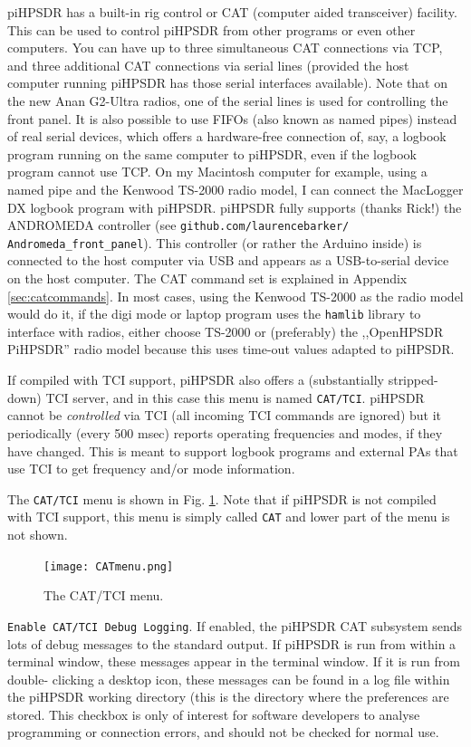 \documentclass[12pt]{book}
\def\rett#1{\texttt{\color{red}#1}}
\def\bltt#1{\texttt{\color{blue}#1}}
\def\pH{pi\-HPSDR\xspace}
\begin{document}
\pH has a built-in rig control or CAT (computer aided transceiver) facility. This can be used to control
\pH from other programs or even other computers. You can have up to three simultaneous CAT connections
via TCP, and three additional CAT connections via serial lines (provided the host computer running \pH
has those serial interfaces available). Note that on the new Anan G2-Ultra radios, one of the serial lines
is used for controlling the front panel.
It is also possible to use FIFOs (also known as named pipes) instead of real serial devices, which offers a
hardware-free connection
of, say, a logbook program running on the same computer to \pH, even if the logbook program cannot use
TCP. On my Macintosh computer for example, using a named pipe and the Kenwood TS-2000 radio model,
I can connect the MacLogger DX logbook program with \pH.
\pH fully supports (thanks Rick!) the ANDROMEDA controller (see \texttt{github.com/laurencebarker/
Andromeda\_front\_panel}).
This controller (or rather the Arduino inside) is connected to the host computer via USB and appears as a
USB-to-serial
device on the host computer. The CAT command set is explained in Appendix \ref{sec:catcommands}. In most
cases, using
the Kenwood TS-2000 as the radio model would do it, if the digi mode or laptop program uses the
\texttt{hamlib} library  to interface with
radios, either choose TS-2000 or (preferably) the ,,OpenHPSDR PiHPSDR'' radio model because this
uses time-out values adapted to \pH.

If compiled  with TCI  support, \pH also offers a (substantially  stripped-down) TCI server, and in this
case this menu is named \bltt{CAT/TCI}. \pH cannot
be \textit{controlled} via TCI (all incoming TCI commands are  ignored) but it periodically (every 500 msec)
reports operating frequencies  and modes, if they have changed. This is meant  to support  logbook programs
and external PAs that use TCI  to get frequency and/or mode information.

The \bltt{CAT/TCI} menu is shown in Fig. \ref{fig:CATmenu}. Note that if \pH  is  not compiled
with TCI support,  this menu is simply called  \bltt{CAT} and lower part  of the menu is not shown.

\begin{figure}[ht]
\center
\texttt{[image: CATmenu.png]}
\caption{The CAT/TCI  menu.}
\label{fig:CATmenu}
\end{figure}

\rett{Enable CAT/TCI Debug Logging}. If enabled, the \pH CAT subsystem sends lots of debug messages to the standard output. If
\pH is run
from within a terminal window, these messages appear in the terminal window. If it is run from double-
clicking a desktop icon,
these messages can be found in a log file within the \pH working directory (this is the directory where
the preferences
are stored. This checkbox is only of interest for software developers to analyse programming or connection
errors, and should
not be checked for normal use.
\end{document}
